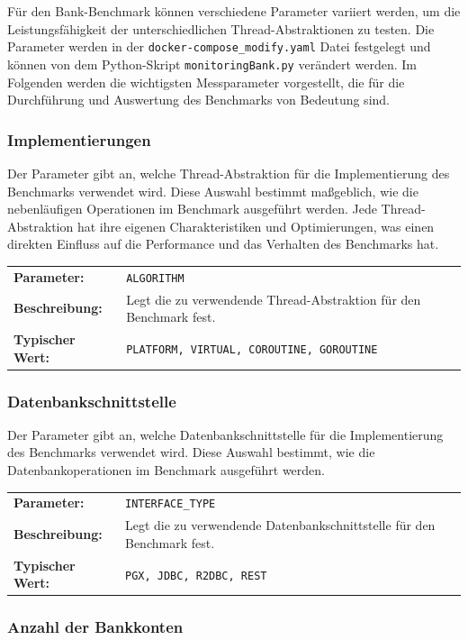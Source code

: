 \documentclass[fontsize=12pt,paper=a4,twoside=semi,parskip=half-,headsepline,headinclude]{scrreprt}
\begin{document}
Für den Bank-Benchmark können verschiedene Parameter variiert werden, um die Leistungsfähigkeit der unterschiedlichen Thread-Abstraktionen zu testen. Die Parameter werden in der \texttt{docker-compose\_modify.yaml} Datei festgelegt und können von dem Python-Skript \texttt{monitoringBank.py} verändert werden. Im Folgenden werden die wichtigsten Messparameter vorgestellt, die für die Durchführung und Auswertung des Benchmarks von Bedeutung sind.

\subsubsection{Implementierungen}

Der Parameter gibt an, welche Thread-Abstraktion für die Implementierung des Benchmarks verwendet wird. Diese Auswahl bestimmt maßgeblich, wie die nebenläufigen Operationen im Benchmark ausgeführt werden. Jede Thread-Abstraktion hat ihre eigenen Charakteristiken und Optimierungen, was einen direkten Einfluss auf die Performance und das Verhalten des Benchmarks hat.

\begin{tabularx}{\textwidth}{@{}lX@{}}
	\textbf{Parameter:} & \texttt{ALGORITHM} \\
	\textbf{Beschreibung:} & Legt die zu verwendende Thread-Abstraktion für den Benchmark fest. \\
	\textbf{Typischer Wert:} & \texttt{PLATFORM, VIRTUAL, COROUTINE, GOROUTINE}
\end{tabularx}

\subsubsection{Datenbankschnittstelle}

Der Parameter gibt an, welche Datenbankschnittstelle für die Implementierung des Benchmarks verwendet wird. Diese Auswahl bestimmt, wie die Datenbankoperationen im Benchmark ausgeführt werden.

\begin{tabularx}{\textwidth}{@{}lX@{}}
	\textbf{Parameter:} & \texttt{INTERFACE\_TYPE} \\
	\textbf{Beschreibung:} & Legt die zu verwendende Datenbankschnittstelle für den Benchmark fest. \\
	\textbf{Typischer Wert:} & \texttt{PGX, JDBC, R2DBC, REST}
\end{tabularx}

\subsubsection{Anzahl der Bankkonten}
\end{document}
